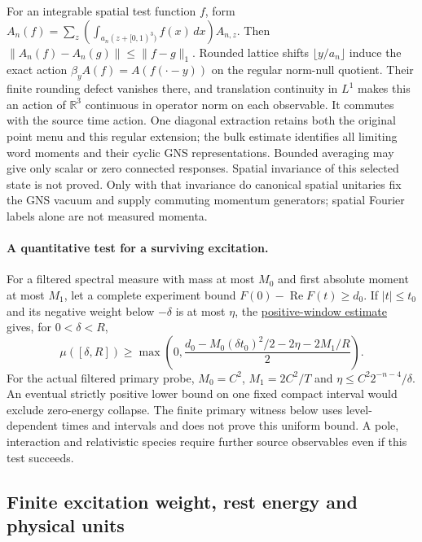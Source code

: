For an integrable spatial test function $f$, form
$A_n(f)=\sum_z(\int_{a_n(z+[0,1)^3)} f(x)\,dx)A_{n,z}$.
Then $\|A_n(f)-A_n(g)\|\le\|f-g\|_1$. Rounded lattice shifts
$\lfloor y/a_n\rfloor$ induce the exact action
$\beta_y A(f)=A(f(\cdot-y))$ on the regular norm-null quotient.
Their finite rounding defect vanishes there, and translation continuity
in $L^1$ makes this an action of $\mathbb R^3$ continuous in operator
norm on each observable. It commutes with the source time action.
One diagonal extraction retains both the original point menu and this
regular extension; the bulk estimate identifies all limiting word
moments and their cyclic GNS representations. Bounded averaging may
give only scalar or zero connected responses. Spatial invariance of
this selected state is not proved. Only with that invariance do canonical
spatial unitaries fix the GNS vacuum and supply commuting momentum
generators; spatial Fourier labels alone are not measured momenta.

\paragraph{A quantitative test for a surviving excitation.}
For a filtered spectral measure with mass at most $M_0$ and first absolute
moment at most $M_1$, let a complete experiment bound
$F(0)-\operatorname{Re}F(t)\ge d_0$. If $|t|\le t_0$ and its negative
weight below $-\delta$ is at most $\eta$, the
\href{https://github.com/FloatingPragma/observer-patch-holography/blob/main/model/particle_positive_window/PROOF.md}{positive-window estimate}
gives, for $0<\delta<R$,
\[
 \mu([\delta,R])\ge
 \max\!\left(0,\frac{d_0-M_0(\delta t_0)^2/2-2\eta-2M_1/R}{2}\right).
\]
For the actual filtered primary probe,
$M_0=C^2$, $M_1=2C^2/T$ and $\eta\le C^2 2^{-n-4}/\delta$.
An eventual strictly positive lower bound on one fixed compact interval
would exclude zero-energy collapse. The finite primary witness below
uses level-dependent times and intervals and does not prove this uniform
bound. A pole, interaction and relativistic species require further
source observables even if this test succeeds.

\subsection{Finite excitation weight, rest energy and physical units}

